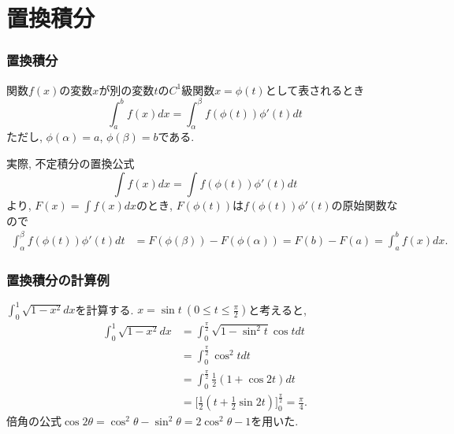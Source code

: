 
\section{置換積分}

\begin{frame}
\frametitle{置換積分}

\begin{Thm}[置換積分の公式] 
関数$f(x)$の変数$x$が別の変数$t$の$C^1$級関数$x=\phi(t)$として表されるとき
$$
\int_a^b f(x)dx =\int_\alpha^\beta f(\phi(t))\phi'(t)dt
$$
ただし, $\phi(\alpha)=a$,  $\phi(\beta)=b$である. 
\end{Thm}
実際, 不定積分の置換公式
$$
\int f(x)dx =\int f(\phi(t))\phi'(t)dt
$$
より, $F(x)=\int f(x)dx$のとき, $F(\phi(t))$は$ f(\phi(t))\phi'(t)$の原始関数なので
\begin{align*}
\int_\alpha^\beta f(\phi(t))\phi'(t)dt &=  F(\phi(\beta))-F(\phi(\alpha))=F(b)-F(a)=\int_a^b f(x)dx. 
\end{align*}

\end{frame}




\begin{frame}
\frametitle{置換積分の計算例}

$\int_0^1 \sqrt{1-x^2}dx$を計算する. 
$x=\sin t \ (0 \le t \le \frac{\pi}{2})$と考えると, 
\begin{align*}
\int_0^1 \sqrt{1-x^2}dx & = \int_0^\frac{\pi}{2} \sqrt{1-\sin^2 t} \cos t dt \\
& =  \int_0^\frac{\pi}{2} \cos^2 t dt \\
& =   \int_0^\frac{\pi}{2} \frac{1}{2}(1+\cos 2t)dt \\
& = \Big[\frac{1}{2}(t+\frac{1}{2} \sin 2t) \Big]_0^\frac{\pi}{2}=\frac{\pi}{4}. 
\end{align*}
倍角の公式$\cos 2 \theta = \cos^2 \theta-\sin^2 \theta=2 \cos^2 \theta-1$を用いた. 

\end{frame}



